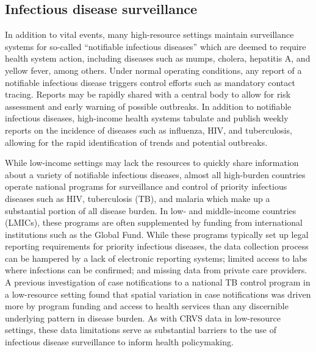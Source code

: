 \documentclass[
]{report}
\begin{document}
\hypertarget{infectious-disease-surveillance}{%
\subsection{Infectious disease surveillance}\label{infectious-disease-surveillance}}

In addition to vital events, many high-resource settings maintain surveillance systems for so-called ``notifiable infectious diseases'' which are deemed to require health system action, including diseases such as mumps, cholera, hepatitis A, and yellow fever, among others. Under normal operating conditions, any report of a notifiable infectious disease triggers control efforts such as mandatory contact tracing. Reports may be rapidly shared with a central body to allow for risk assessment and early warning of possible outbreaks.\autocite{Vlieg2017} In addition to notifiable infectious diseases, high-income health systems tabulate and publish weekly reports on the incidence of diseases such as influenza, HIV, and tuberculosis, allowing for the rapid identification of trends and potential outbreaks.\autocite{Thacker1989}

While low-income settings may lack the resources to quickly share information about a variety of notifiable infectious diseases, almost all high-burden countries operate national programs for surveillance and control of priority infectious diseases such as HIV, tuberculosis (TB), and malaria which make up a substantial portion of all disease burden. In low- and middle-income countries (LMICs), these programs are often supplemented by funding from international institutions such as the Global Fund.\autocite{Mauch2010} While these programs typically set up legal reporting requirements for priority infectious diseases, the data collection process can be hampered by a lack of electronic reporting systems; limited access to labs where infections can be confirmed; and missing data from private care providers.\autocite{Uplekar2016} A previous investigation of case notifications to a national TB control program in a low-resource setting found that spatial variation in case notifications was driven more by program funding and access to health services than any discernible underlying pattern in disease burden.\autocite{Rood2019} As with CRVS data in low-resource settings, these data limitations serve as substantial barriers to the use of infectious disease surveillance to inform health policymaking.
\end{document}

